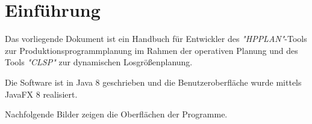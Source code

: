 \documentclass[12pt,a4paper, listof=entryprefix, bibliography=totocnumbered,toc=listofnumbered,lof=listofnumbered]{scrartcl}
\newcounter{verzeichnis}
\begin{document}
\singlespacing %
\setcounter{section}{0}
\setcounter{page}{1}

\tableofcontents %
\pagebreak

\onehalfspacing %
\renewcommand{\thesection}{\arabic{section}} %
\setcounter{page}{1}	%
\setcounter{section}{0}
\renewcommand{\sectionmark}[1]{\markright{#1}} %
\renewcommand{\subsectionmark}[1]{}            %
\renewcommand{\subsubsectionmark}[1]{}         %
\rhead{\rightmark}                             %

\section{Einführung}
Das vorliegende Dokument ist ein Handbuch für Entwickler des \textit{"\gls{HPPLAN}"}-Tools zur Produktionsprogrammplanung im Rahmen der operativen Planung und des Tools \textit{"\gls{CLSP}"} zur dynamischen Losgrößenplanung.


Die Software ist in Java 8 geschrieben und die Benutzeroberfläche wurde mittels JavaFX 8 realisiert.

Nachfolgende Bilder zeigen die Oberflächen der Programme.
\end{document}
